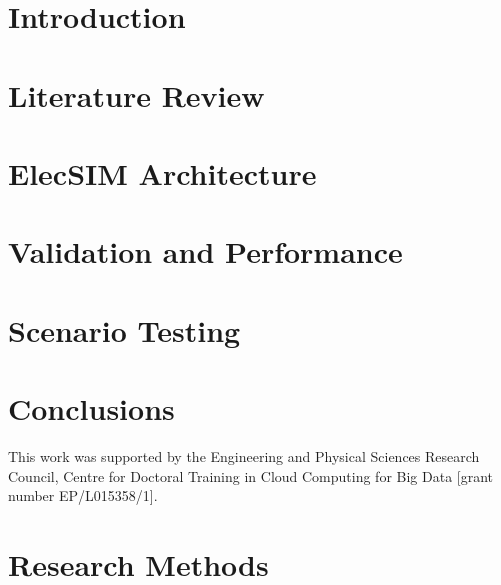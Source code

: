 \documentclass[sigconf]{acmart}
\begin{document}
%
\maketitle


\section{Introduction}


\section{Literature Review}\label{Literature Review}

\section{ElecSIM Architecture} \label{Model}



\section{Validation and Performance}\label{Valdiation and Performance}



\section{Scenario Testing}\label{Scenario Testing}




\section{Conclusions}\label{Conclusion}





%
\begin{acks}
This work was supported by the Engineering and Physical Sciences Research Council, Centre for Doctoral Training in Cloud Computing for Big Data [grant number EP/L015358/1].
\end{acks}


%



% 
\appendix


\section{Research Methods}

\end{document}

